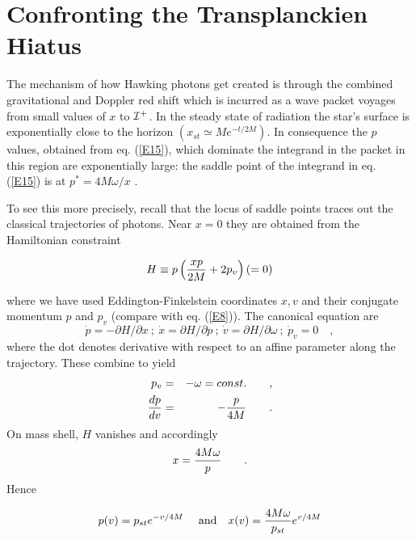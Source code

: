 \documentclass[12pt]{article}
\begin{document}
\section{Confronting the Transplanckien Hiatus}\label{SS4}



The mechanism of how Hawking photons get created is through the combined
gravitational and Doppler red shift which is incurred as a wave packet voyages
from small values of $x$ to $ {\cal I}^+$. In the steady state of radiation the
star's surface is exponentially close to the horizon $ (x_{st} \simeq M e^{-
t/2M})$. In consequence the $p$ values, obtained from  eq. (\ref{E15}), which
dominate the integrand in the packet in this region are exponentially large:
the saddle point of the integrand in  eq. (\ref{E15}) is at $ p^* = 4 M \omega /
x$ \cite{PaBr0}. 

To see this more precisely, recall that the locus of saddle points traces out
the classical trajectories of photons. Near $x = 0$ they are obtained from the
Hamiltonian
constraint 

\begin{eqnarray}
H \equiv p \left( {xp \over 2 M} + 2 p_v \right) (=0) \label {E18}
\end{eqnarray}



\noindent where we have used Eddington-Finkelstein coordinates $x,v$ and their
conjugate momentum $p$ and $p_v$ (compare with  eq. (\ref{E8})).
The canonical equation  are 
\begin{equation}
 {\dot p} = - \partial H / \partial x\ ;\ 
{\dot x} = \partial H / \partial p\ ;\ {\dot v} = \partial H / \partial 
\omega\ ;\ {\dot p_v} =0\quad , 
\end{equation}
where the dot denotes derivative with respect to an affine parameter along the
trajectory. These combine to yield 
\begin{eqnarray}
p_v&=&-\omega=const. \qquad ,\\
{dp \over dv}& =& -{p\over 4M}\qquad . \label{E20a}
\end{eqnarray}
 On mass
shell, $H$ vanishes and accordingly
\begin{eqnarray}
x = {4 M \omega \over p} \qquad .\label {E19}
\end{eqnarray}
\noindent Hence

\begin{equation}
p(v) = p_{st} e^{- v/4M} \quad \mbox{ and} \quad x(v) 
= {4 M \omega \over p_{st}}
e^{v/4M} \label {E20}
\end{equation}
\end{document}
